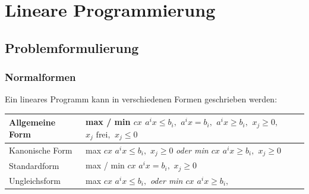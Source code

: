 \section{Lineare Programmierung }

\subsection{Problemformulierung}
  \subsubsection{Normalformen}
    Ein lineares Programm kann in verschiedenen Formen geschrieben werden:
    
    \begin{tabularx}{\textwidth}{|l|X|}
      \hline
      Allgemeine Form & 
          max / min $cx$ \newline
          $a^ix \leq b_i,$ \newline
          $a^ix = b_i,$ \newline
          $a^ix \geq b_i,$ \newline
          $x_j \geq 0,$ \newline
          $x_j \text{ frei},$ \newline
          $x_j \leq 0$
          \\
      \hline
      Kanonische Form & 
          max $cx$ \newline
          $a^ix \leq b_i,$ \newline
          $x_j \geq 0$ \newline
          \em oder \em\newline
          min $cx$ \newline
          $a^ix \geq b_i,$ \newline
          $x_j \geq 0$
         \\
      \hline
      Standardform & 
        max / min $cx$ \newline
        $a^ix = b_i,$ \newline
        $x_j \geq 0$
        \\
      \hline
      Ungleichsform & 
        max $cx$ \newline
        $a^ix \leq b_i,$ \newline
        \em oder \em \newline
        min $cx$ \newline
        $a^ix \geq b_i,$
        \\
      \hline
    \end{tabularx}

